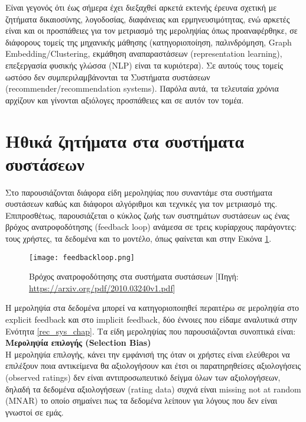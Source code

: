 Είναι γεγονός ότι έως σήμερα έχει διεξαχθεί αρκετά εκτενής έρευνα σχετική με ζητήματα δικαιοσύνης, λογοδοσίας, διαφάνειας και ερμηνευσιμότητας, ενώ αρκετές είναι και οι προσπάθειες για τον μετριασμό της μεροληψίας όπως προαναφέρθηκε, σε διάφορους τομείς της μηχανικής μάθησης (κατηγοριοποίηση, παλινδρόμηση, Graph Embedding/Clustering, εκμάθηση αναπαραστάσεων (representation learning), επεξεργασία φυσικής γλώσσα (NLP) είναι τα κυριότερα). Σε αυτούς τους τομείς ωστόσο δεν συμπεριλαμβάνονται τα Συστήματα συστάσεων (recommender/recommendation systems). Παρόλα αυτά, τα τελευταία χρόνια αρχίζουν και γίνονται αξιόλογες προσπάθειες και σε αυτόν τον τομέα.


\section{Ηθικά ζητήματα στα συστήματα συστάσεων}
\noindent Στο \cite{chenBiasDebiasRecommender2020} παρουσιάζονται διάφορα είδη μεροληψίας που συναντάμε στα συστήματα συστάσεων καθώς και διάφοροι αλγόριθμοι και τεχνικές για τον μετριασμό της. Επιπροσθέτως, παρουσιάζεται ο κύκλος ζωής των συστημάτων συστάσεων ως ένας βρόχος ανατροφοδότησης (feedback loop) ανάμεσα σε τρεις κυρίαρχους παράγοντες: τους χρήστες, τα δεδομένα και το μοντέλο, όπως φαίνεται και στην Εικόνα \ref{fig:feedbackloop}.
\begin{figure}[!htb]
	\centering
	\texttt{[image: feedbackloop.png]}
	\caption[Βρόχος ανατροφοδότησης στα συστήματα συστάσεων]{Βρόχος ανατροφοδότησης στα συστήματα συστάσεων [Πηγή: \url{https://arxiv.org/pdf/2010.03240v1.pdf}]}
	\label{fig:feedbackloop}
\end{figure}
Η μεροληψία στα δεδομένα μπορεί να κατηγοριοποιηθεί περαιτέρω σε μεροληψία στο explicit feedback και στο implicit feedback, δύο έννοιες που είδαμε αναλυτικά στην Ενότητα \ref{rec_sys_chap}. Τα είδη μεροληψίας που παρουσιάζονται συνοπτικά είναι:\\

\noindent\textbf{Μεροληψία επιλογής (Selection Bias)}\\
Η μεροληψία επιλογής, κάνει την εμφάνισή της όταν οι χρήστες είναι ελεύθεροι να επιλέξουν ποια αντικείμενα θα αξιολογήσουν και έτσι οι παρατηρηθείσες αξιολογήσεις (observed ratings) δεν είναι αντιπροσωπευτικό δείγμα όλων των αξιολογήσεων, δηλαδή τα δεδομένα αξιολογήσεων (rating data) συχνά είναι missing not at random (MNAR) το οποίο σημαίνει πως τα δεδομένα λείπουν για λόγους που δεν είναι γνωστοί σε εμάς.\\

